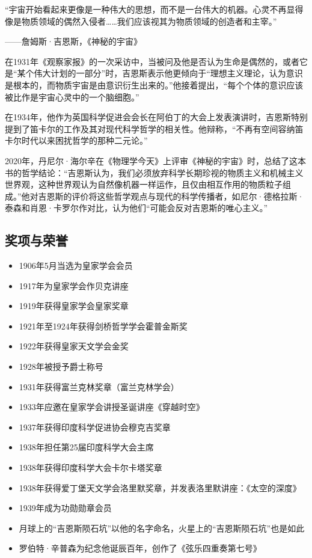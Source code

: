 “宇宙开始看起来更像是一种伟大的思想，而不是一台伟大的机器。心灵不再显得像是物质领域的偶然入侵者……我们应该视其为物质领域的创造者和主宰。”

——詹姆斯·吉恩斯，《神秘的宇宙》

在1931年《观察家报》的一次采访中，当被问及他是否认为生命是偶然的，或者它是“某个伟大计划的一部分”时，吉恩斯表示他更倾向于“理想主义理论，认为意识是根本的，而物质宇宙是由意识衍生出来的。”他接着提出，“每个个体的意识应该被比作是宇宙心灵中的一个脑细胞。”

在1934年，他作为英国科学促进会会长在阿伯丁的大会上发表演讲时，吉恩斯特别提到了笛卡尔的工作及其对现代科学哲学的相关性。他辩称，“不再有空间容纳笛卡尔时代以来困扰哲学的那种二元论。”

2020年，丹尼尔·海尔辛在《物理学今天》上评审《神秘的宇宙》时，总结了这本书的哲学结论：“吉恩斯认为，我们必须放弃科学长期珍视的物质主义和机械主义世界观，这种世界观认为自然像机器一样运作，且仅由相互作用的物质粒子组成。”他对吉恩斯的评价将这些哲学观点与现代的科学传播者，如尼尔·德格拉斯·泰森和肖恩·卡罗尔作对比，认为他们“可能会反对吉恩斯的唯心主义。”
\subsection{奖项与荣誉}  
\begin{itemize}
\item 1906年5月当选为皇家学会会员  
\item 1917年为皇家学会作贝克讲座  
\item 1919年获得皇家学会皇家奖章  
\item 1921年至1924年获得剑桥哲学学会霍普金斯奖  
\item 1922年获得皇家天文学会金奖  
\item 1928年被授予爵士称号  
\item 1931年获得富兰克林奖章（富兰克林学会）  
\item 1933年应邀在皇家学会讲授圣诞讲座《穿越时空》  
\item 1937年获得印度科学促进协会穆克吉奖章  
\item 1938年担任第25届印度科学大会主席  
\item 1938年获得印度科学大会卡尔卡塔奖章  
\item 1938年获得爱丁堡天文学会洛里默奖章，并发表洛里默讲座：《太空的深度》  
\item 1939年成为功勋勋章会员  
\item 月球上的“吉恩斯陨石坑”以他的名字命名，火星上的“吉恩斯陨石坑”也是如此  
\item 罗伯特·辛普森为纪念他诞辰百年，创作了《弦乐四重奏第七号》
\end{itemize}